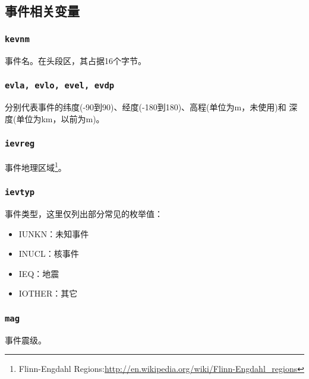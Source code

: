 \subsection{事件相关变量}
\subsubsection{\texttt{kevnm}}
事件名。在头段区，其占据16个字节。

\subsubsection{\texttt{evla, evlo, evel, evdp}}
分别代表事件的纬度(-90到90)、经度(-180到180)、高程(单位为m，未使用)和
深度(单位为km，以前为m)。

\subsubsection{\texttt{ievreg}\dag}
事件地理区域\footnote{Flinn-Engdahl Regions:\url{http://en.wikipedia.org/wiki/Flinn-Engdahl_regions}}。

\subsubsection{\texttt{ievtyp}}
事件类型，这里仅列出部分常见的枚举值：
\begin{itemize}
\ttfamily
\item IUNKN：未知事件
\item INUCL：核事件
\item IEQ：地震
\item IOTHER：其它
\end{itemize}

\subsubsection{\texttt{mag}}
事件震级。

